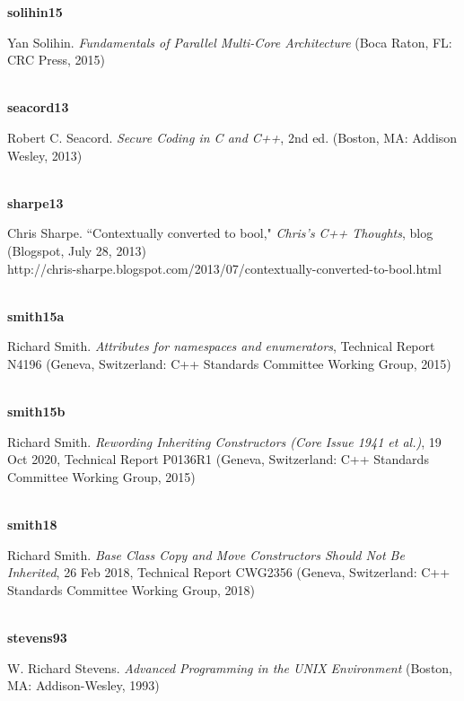 \noindent\textbf{solihin15}\\
\hspace*{2em}\parbox[t]{\textwidth}{Yan Solihin. \textit{Fundamentals of Parallel Multi-Core Architecture} (Boca Raton, FL: CRC Press, 2015)}\\

\noindent\textbf{seacord13}\\
\hspace*{2em}\parbox[t]{\textwidth}{Robert C. Seacord. \textit{Secure Coding in C and C++}, 2nd ed. (Boston, MA: Addison Wesley, 2013)}\\

\noindent\textbf{sharpe13}\\
\hspace*{2em}\parbox[t]{\textwidth}{Chris Sharpe. ``Contextually converted to bool," \textit{Chris's C++ Thoughts}, blog (Blogspot, July 28, 2013)\\
http://chris-sharpe.blogspot.com/2013/07/contextually-converted-to-bool.html}\\

\noindent\textbf{smith15a}\\
\hspace*{2em}\parbox[t]{\textwidth}{Richard Smith. \textit{Attributes for namespaces and enumerators},  Technical Report N4196 (Geneva, Switzerland: C++ Standards Committee Working Group, 2015)}\\

\noindent\textbf{smith15b}\\
\hspace*{2em}\parbox[t]{\textwidth}{Richard Smith. \textit{Rewording Inheriting Constructors (Core Issue 1941 et al.)},  19 Oct 2020, Technical Report P0136R1 (Geneva, Switzerland: C++ Standards Committee Working Group, 2015)}\\

\noindent\textbf{smith18}\\
\hspace*{2em}\parbox[t]{\textwidth}{Richard Smith. \textit{Base Class Copy and Move Constructors Should Not Be Inherited}, 26 Feb 2018, Technical Report CWG2356 (Geneva, Switzerland: C++ Standards Committee Working Group, 2018)}\\


\noindent\textbf{stevens93}\\
\hspace*{2em}\parbox[t]{\textwidth}{W. Richard Stevens. \textit{Advanced Programming in the UNIX Environment} (Boston, MA: Addison-Wesley, 1993)} \\

